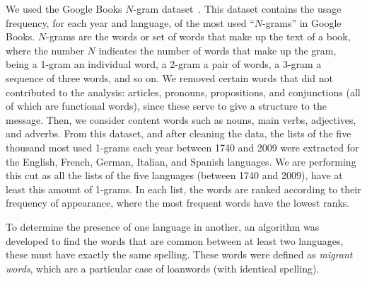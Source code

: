 \documentclass[10pt,letterpaper]{article} %
\begin{document}
We used the Google Books $N$-gram dataset~\cite{ngramv}.
This dataset contains the usage frequency, for each year and language, of
the most used ``$N$-grams'' in Google Books. 
$N$-grams are the words or set of words that make up the text of a
book, where the number $N$ indicates the number of words that make up the gram,
being a 1-gram an individual word, a 2-gram a pair of words,
a 3-gram a sequence of three words, and so on.
We removed certain words that did not contributed to the analysis: articles,
pronouns, propositions, and conjunctions (all  of which are functional words),
since these serve to give a structure to the message. Then, we consider content
words such as nouns, main verbs, adjectives, and adverbs. 
From this dataset, and after cleaning the data, the lists of the five thousand
most used 1-grams each year
between 1740 and 2009 were extracted for the English, French, German, Italian,
and Spanish languages.
We are performing this cut as all the lists of the five languages (between 1740
and 2009), have at least this amount of 1-grams.
In each list, the words are ranked according to their
frequency of appearance, where the most frequent words have the lowest ranks.

% 

To determine the presence of one language in another, an algorithm was
developed to find the words that are common between at least two languages,
these must have exactly the same spelling. These words were defined
as \textit{migrant words}, which are a particular case of loanwords (with identical spelling).
\end{document}
